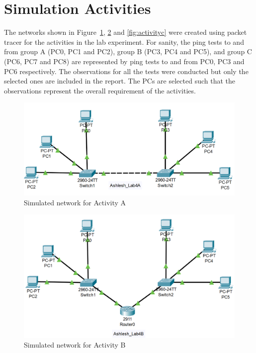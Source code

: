 \documentclass{lab_sheet}
\begin{document}
    \section{Simulation Activities}
    The networks shown in Figure~\ref{fig:activitya}, \ref{fig:activityb} and \ref{fig:activityc} were created using packet tracer for the activities in the lab experiment. For sanity, the ping tests to and from group A (PC0, PC1 and PC2), group B (PC3, PC4 and PC5), and group C (PC6, PC7 and PC8) are represented by ping tests to and from PC0, PC3 and PC6 respectively. The observations for all the tests were conducted but only the selected ones are included in the report. The PCs are selected such that the observations represent the overall requirement of the activities.
    \begin{figure}[H]
        \centering
        \includegraphics[scale=0.6]{./Figures/activitya.png}
        \caption{Simulated network for Activity A}
        \label{fig:activitya}
    \end{figure}
    \begin{figure}[H]
        \centering
        \includegraphics[scale=0.7]{./Figures/activityb.png}
        \caption{Simulated network for Activity B}
        \label{fig:activityb}
    \end{figure}
\end{document}
